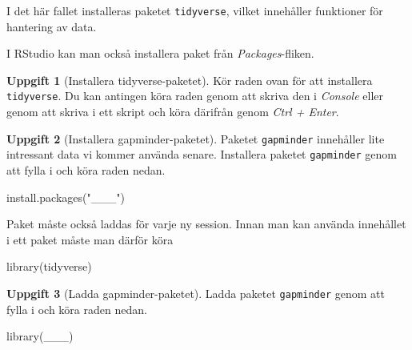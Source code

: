 \documentclass[
]{book}
\newenvironment{Shaded}{\begin{snugshade}}{\end{snugshade}}
\newcommand{\FunctionTok}[1]{\textcolor[rgb]{0.00,0.00,0.00}{#1}}
\newcommand{\NormalTok}[1]{#1}
\newcommand{\StringTok}[1]{\textcolor[rgb]{0.31,0.60,0.02}{#1}}
\theoremstyle{definition}
\theoremstyle{definition}
\theoremstyle{definition}
\newtheorem{exercise}{Uppgift}[chapter]
\theoremstyle{definition}
\theoremstyle{remark}
\begin{document}
I det här fallet installeras paketet \texttt{tidyverse}, vilket innehåller funktioner för hantering av data.

I RStudio kan man också installera paket från \emph{Packages}-fliken.

\begin{exercise}[Installera tidyverse-paketet]
Kör raden ovan för att installera \texttt{tidyverse}. Du kan antingen köra raden genom att skriva den i \emph{Console} eller genom att skriva i ett skript och köra därifrån genom \emph{Ctrl + Enter}.
\end{exercise}

\begin{exercise}[Installera gapminder-paketet]

Paketet \texttt{gapminder} innehåller lite intressant data vi kommer använda senare. Installera paketet \texttt{gapminder} genom att fylla i och köra raden nedan.

\begin{Shaded}
\begin{Highlighting}[]
\FunctionTok{install.packages}\NormalTok{(}\StringTok{"\_\_\_"}\NormalTok{)}
\end{Highlighting}
\end{Shaded}

\end{exercise}

Paket måste också laddas för varje ny session. Innan man kan använda innehållet i ett paket måste man därför köra

\begin{Shaded}
\begin{Highlighting}[]
\FunctionTok{library}\NormalTok{(tidyverse)}
\end{Highlighting}
\end{Shaded}

\begin{exercise}[Ladda gapminder-paketet]

Ladda paketet \texttt{gapminder} genom att fylla i och köra raden nedan.

\begin{Shaded}
\begin{Highlighting}[]
\FunctionTok{library}\NormalTok{(\_\_\_)}
\end{Highlighting}
\end{Shaded}

\end{exercise}
\end{document}
